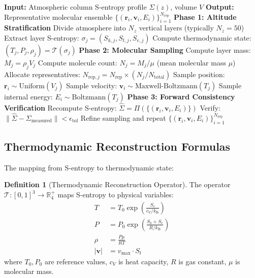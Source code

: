 \documentclass[twocolumn,10pt,a4paper]{article}
\theoremstyle{definition}
\newtheorem{definition}[theorem]{Definition}
\theoremstyle{remark}
\newcommand{\kB}{k_{\mathrm{B}}}
\begin{document}
\begin{algorithm}[H]
\caption{Molecular Ensemble Reconstruction from S-Entropy}
\label{alg:reconstruction}
\begin{algorithmic}[1]
\STATE \textbf{Input:} Atmospheric column S-entropy profile $\Sigma(z)$, volume $V$
\STATE \textbf{Output:} Representative molecular ensemble $\{(\mathbf{r}_i, \mathbf{v}_i, E_i)\}_{i=1}^{N_{\text{rep}}}$
\STATE
\STATE \textbf{Phase 1: Altitude Stratification}
\STATE Divide atmosphere into $N_z$ vertical layers (typically $N_z = 50$)
    \STATE Extract layer S-entropy: $\sigma_j = (S_{k,j}, S_{t,j}, S_{e,j})$
    \STATE Compute thermodynamic state: $(T_j, P_j, \rho_j) = \mathcal{T}(\sigma_j)$
\ENDFOR
\STATE
\STATE \textbf{Phase 2: Molecular Sampling}
    \STATE Compute layer mass: $M_j = \rho_j V_j$
    \STATE Compute molecule count: $N_j = M_j / \mu$ (mean molecular mass $\mu$)
    \STATE Allocate representatives: $N_{\text{rep},j} = N_{\text{rep}} \times (N_j / N_{\text{total}})$
        \STATE Sample position: $\mathbf{r}_i \sim \text{Uniform}(V_j)$
        \STATE Sample velocity: $\mathbf{v}_i \sim \text{Maxwell-Boltzmann}(T_j)$
        \STATE Sample internal energy: $E_i \sim \text{Boltzmann}(T_j)$
    \ENDFOR
\ENDFOR
\STATE
\STATE \textbf{Phase 3: Forward Consistency Verification}
\STATE Recompute S-entropy: $\hat{\Sigma} = \Pi(\{(\mathbf{r}_i, \mathbf{v}_i, E_i)\})$
\STATE Verify: $\|\hat{\Sigma} - \Sigma_{\text{measured}}\| < \epsilon_{\text{tol}}$
    \STATE Refine sampling and repeat
\ENDIF
\STATE
\RETURN $\{(\mathbf{r}_i, \mathbf{v}_i, E_i)\}_{i=1}^{N_{\text{rep}}}$
\end{algorithmic}
\end{algorithm}

\subsection{Thermodynamic Reconstruction Formulas}

The mapping from S-entropy to thermodynamic state:

\begin{definition}[Thermodynamic Reconstruction Operator]
\label{def:thermo_op}
The operator $\mathcal{T}: [0,1]^3 \to \mathbb{R}^+_4$ maps S-entropy to physical variables:
\begin{align}
    T &= T_0 \exp\left(\frac{S_e}{c_V/\kB}\right) \\
    P &= P_0 \exp\left(\frac{S_k + S_e}{R/\kB}\right) \\
    \rho &= \frac{P\mu}{RT} \\
    |\mathbf{v}| &= v_{\text{max}} \cdot S_t
\end{align}
where $T_0, P_0$ are reference values, $c_V$ is heat capacity, $R$ is gas constant, $\mu$ is molecular mass.
\end{definition}
\end{document}
